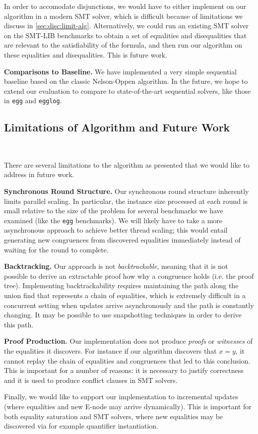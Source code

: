 In order to accomodate disjunctions, we would have to either implement on our
algorithm in a modern SMT solver, which is difficult because of limitations we
discuss in \autoref{sec:disc:limit-alg}. Alternatively, we could run an existing
SMT solver on the SMT-LIB benchmarks to obtain a set of equalities and
disequalities that are relevant to the satisfiability of the formula, and then
run our algorithm on these equalities and disequalities. This is future work.

\textbf{Comparisons to Baseline.} We have implemented a very simple sequential
baseline based on the classic Nelson-Oppen algorithm. In the future, we hope to
extend our evaluation to compare to state-of-the-art sequential solvers, like
those in \texttt{egg} and \texttt{egglog}. 

\subsection{Limitations of Algorithm and Future Work}~\label{sec:disc:limit-alg}

There are several limitations to the algorithm as presented that we would like
to address in future work. 

\textbf{Synchronous Round Structure.} Our synchronous round structure inherently
limits parallel scaling. In particular, the instance size processed at each
round is small relative to the size of the problem for several benchmarks we
have examined (like the \texttt{egg} benchmarks). We will likely have to take a
more asynchronous approach to achieve better thread scaling; this would entail
generating new congruences from discovered equalities immediately instead of
waiting for the round to complete.

\textbf{Backtracking.} Our approach is not \textit{backtrackable}, meaning that
it is not possible to derive an extractable proof how why a congruence holds
(i.e. the proof tree). Implementing backtrackability requires maintaining the
path along the union find that represents a chain of equalities, which is
extremely difficult in a concurrent setting when updates arrive asynchronously
and the path is constantly changing. It may be possible to use snapshotting
techniques in order to derive this path.

\textbf{Proof Production.} Our implementation does not produce \emph{proofs} or
\emph{witnesses} of the equalities it discovers. For instance if our algorithm
discovers that $x = y$, it cannot replay the chain of equalities and congruences
that led to this conclusion. This is important for a number of reasons: it is
necessary to justify correctness and it is used to produce conflict clauses in
SMT solvers.

Finally, we would like to support our implementation to incremental updates
(where equalities and new E-node may arrive dynamically). This is important for
both equality saturation and SMT solvers, where new equalities may be discovered
via for example quantifier instantiation.
